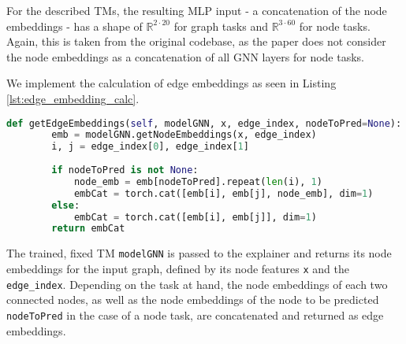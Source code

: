 For the described \acp{TM}, the resulting MLP input - a concatenation of the node embeddings - has a shape of $\mathbb{R}^{2\cdot20}$ for graph tasks and $\mathbb{R}^{3\cdot60}$ for node tasks. Again, this is taken from the original codebase, as the paper does not consider the node embeddings as a concatenation of all GNN layers for node tasks.

We implement the calculation of edge embeddings as seen in Listing \ref{lst:edge_embedding_calc}.
\begin{lstlisting}[language=Python, caption=Implementation of edge embedding calculation., label=lst:edge_embedding_calc]
    def getEdgeEmbeddings(self, modelGNN, x, edge_index, nodeToPred=None):
        emb = modelGNN.getNodeEmbeddings(x, edge_index)
        i, j = edge_index[0], edge_index[1]
        
        if nodeToPred is not None:
            node_emb = emb[nodeToPred].repeat(len(i), 1)
            embCat = torch.cat([emb[i], emb[j], node_emb], dim=1)
        else:
            embCat = torch.cat([emb[i], emb[j]], dim=1)
        return embCat
\end{lstlisting}
The trained, fixed \ac{TM} \lstinline|modelGNN| is passed to the explainer and returns its node embeddings for the input graph, defined by its node features \lstinline|x| and the \lstinline|edge_index|. Depending on the task at hand, the node embeddings of each two connected nodes, as well as the node embeddings of the node to be predicted \lstinline|nodeToPred| in the case of a node task, are concatenated and returned as edge embeddings. \bigskip

